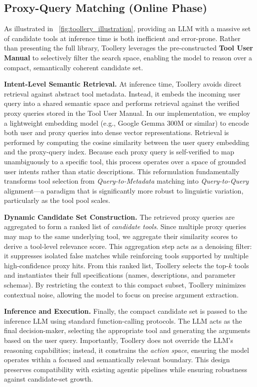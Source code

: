 \documentclass[11pt]{article}
\begin{document}
\subsection{Proxy-Query Matching (Online Phase)}



As illustrated in ~\ref{fig:toollery_illustration}, providing an LLM with a massive set of candidate tools at inference time is both inefficient and error-prone. Rather than presenting the full library, Toollery leverages the pre-constructed \textbf{Tool User Manual} to selectively filter the search space, enabling the model to reason over a compact, semantically coherent candidate set.


\textbf{Intent-Level Semantic Retrieval.}
At inference time, Toollery avoids direct retrieval against abstract tool metadata. Instead, it embeds the incoming user query into a shared semantic space and performs retrieval against the verified proxy queries stored in the Tool User Manual. In our implementation, we employ a lightweight embedding model (e.g., Google Gemma 300M or similar) to encode both user and proxy queries into dense vector representations. Retrieval is performed by computing the cosine similarity between the user query embedding and the proxy-query index. Because each proxy query is self-verified to map unambiguously to a specific tool, this process operates over a space of grounded user intents rather than static descriptions. This reformulation fundamentally transforms tool selection from \textit{Query-to-Metadata} matching into \textit{Query-to-Query} alignment---a paradigm that is significantly more robust to linguistic variation, particularly as the tool pool scales.


\textbf{Dynamic Candidate Set Construction.}
The retrieved proxy queries are aggregated to form a ranked list of \emph{candidate tools}. Since multiple proxy queries may map to the same underlying tool, we aggregate their similarity scores to derive a tool-level relevance score. This aggregation step acts as a denoising filter: it suppresses isolated false matches while reinforcing tools supported by multiple high-confidence proxy hits. From this ranked list, Toollery selects the top-$k$ tools and instantiates their full specifications (names, descriptions, and parameter schemas). By restricting the context to this compact subset, Toollery minimizes contextual noise, allowing the model to focus on precise argument extraction.


\textbf{Inference and Execution.}
Finally, the compact candidate set is passed to the inference LLM using standard function-calling protocols. The LLM acts as the final decision-maker, selecting the appropriate tool and generating the arguments based on the user query. Importantly, Toollery does not override the LLM's reasoning capabilities; instead, it constrains the \textit{action space}, ensuring the model operates within a focused and semantically relevant boundary. This design preserves compatibility with existing agentic pipelines while ensuring robustness against candidate-set growth.
\end{document}
